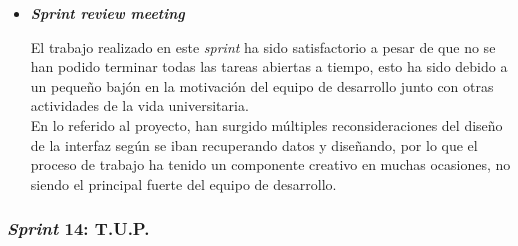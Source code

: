 \begin{itemize}
\item \textbf{\textit{Sprint review meeting}}

El trabajo realizado en este \textit{sprint} ha sido satisfactorio a pesar de que no se han podido terminar todas las tareas abiertas a tiempo, esto ha sido debido a un pequeño bajón en la motivación del equipo de desarrollo junto con otras actividades de la vida universitaria. \\
En lo referido al proyecto, han surgido múltiples reconsideraciones del diseño de la interfaz según se iban recuperando datos y diseñando, por lo que el proceso de trabajo ha tenido un componente creativo en muchas ocasiones, no siendo el principal fuerte del equipo de desarrollo.
\end{itemize}

\subsubsection{\textit{Sprint} 14: T.U.P.}
